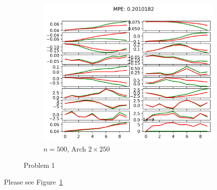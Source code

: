 \begin{figure}[htbp]
    \begin{subfigure}[b]{0.3\linewidth}
        \centering
        \includegraphics[width=1.0\linewidth]{figures/p1-n500_2_250.png}
        \caption{$n = 500$, Arch $2\times 250$}
    \end{subfigure}
    \caption{Problem 1}
    \label{fig:p1}
\end{figure}

Please see Figure~\ref{fig:p1}
